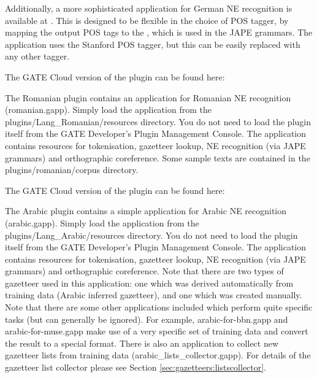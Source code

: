 Additionally, a more sophisticated application for German NE recognition is
available at .
This is designed to be flexible in the choice of POS tagger, by mapping the output POS 
tags to the , 
which is used in the JAPE grammars. The application uses the Stanford POS tagger, 
but this can be easily replaced with any other tagger.

The GATE Cloud version of the plugin can be found here: \\


The Romanian plugin contains an application for Romanian NE
recognition (romanian.gapp). Simply load the application from the
plugins/Lang\_Romanian/resources directory. You do not need to load the
plugin itself from the GATE Developer's Plugin
Management Console. The application
contains resources for tokenisation, gazetteer lookup, NE recognition
(via JAPE grammars) and orthographic coreference. Some sample texts
are contained in the plugins/romanian/corpus directory.

The GATE Cloud version of the plugin can be found here: \\


The Arabic plugin contains a simple application for Arabic NE
recognition (arabic.gapp). Simply load the application from the
plugins/Lang\_Arabic/resources directory. You do not need to load the plugin
itself from the GATE Developer's Plugin
Management Console. The application contains
resources for tokenisation, gazetteer lookup, NE recognition (via JAPE
grammars) and orthographic coreference. Note that there are two types
of gazetteer used in this application: one which was derived
automatically from training data (Arabic inferred gazetteer), and one
which was created manually. Note that there are some other
applications included which perform quite specific tasks (but can
generally be ignored). For example, arabic-for-bbn.gapp and
arabic-for-muse.gapp make use of a very specific set of training data
and convert the result to a special format. There is also an
application to collect new gazetteer lists from training data
(arabic\_lists\_collector.gapp). For details of the gazetteer list
collector please see Section \ref{sec:gazetteers:listscollector}.


